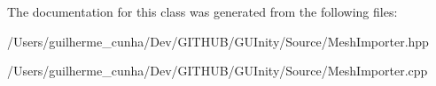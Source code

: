 The documentation for this class was generated from the following files\+:\begin{DoxyCompactItemize}
\item 
/\+Users/guilherme\+\_\+cunha/\+Dev/\+G\+I\+T\+H\+U\+B/\+G\+U\+Inity/\+Source/Mesh\+Importer.\+hpp\item 
/\+Users/guilherme\+\_\+cunha/\+Dev/\+G\+I\+T\+H\+U\+B/\+G\+U\+Inity/\+Source/Mesh\+Importer.\+cpp\end{DoxyCompactItemize}
